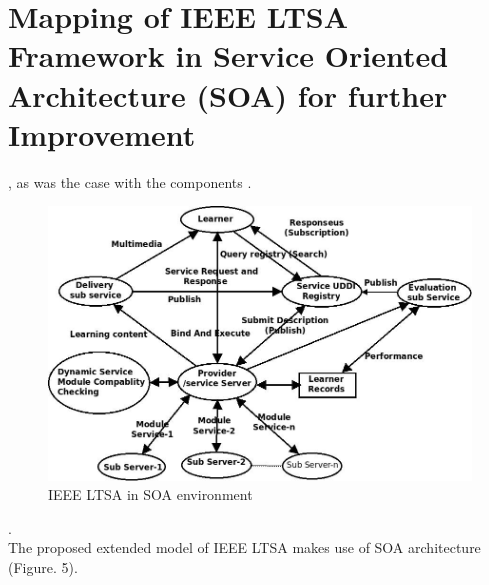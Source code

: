 \chapter{Mapping of IEEE LTSA Framework in Service Oriented Architecture (SOA) for further Improvement}
 \blindtext, as was
the case with the components \cite{lan}.
\begin{figure}[h!]
 \centering
 \includegraphics[scale=.5]{s0ajournal.jpeg}
 \caption{IEEE LTSA in SOA environment}
\end{figure}

    \blindtext.\\

   The proposed extended model of IEEE LTSA makes use of SOA architecture
(Figure. 5). \blindtext
